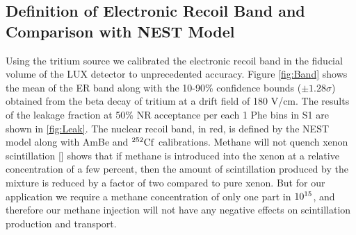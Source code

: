\subsection{Definition of Electronic Recoil Band and Comparison with NEST Model}

Using the tritium source we calibrated the electronic recoil band in the fiducial volume of the LUX detector to unprecedented accuracy. Figure \ref{fig:Band} shows the mean of the ER band along with the 10-90\% confidence bounds ($\pm 1.28\sigma$) obtained from the beta decay of tritium at a drift field of 180 V/cm. The results of the leakage fraction at 50\% NR acceptance per each 1 Phe bins in S1 are shown in \ref{fig:Leak}. The nuclear recoil band, in red, is defined by the NEST model along with AmBe and $\rm^{252}Cf$  calibrations. Methane will not quench xenon scintillation [\cite{Kirill_Methane}] shows that if methane is introduced into the xenon at a relative concentration of a few percent, then the amount of scintillation produced by the mixture is reduced by a factor of two compared to pure xenon. But for our application we require a methane concentration of only one part in $\rm10^{15}$, and therefore our methane injection will not have any negative effects on scintillation production and transport.

